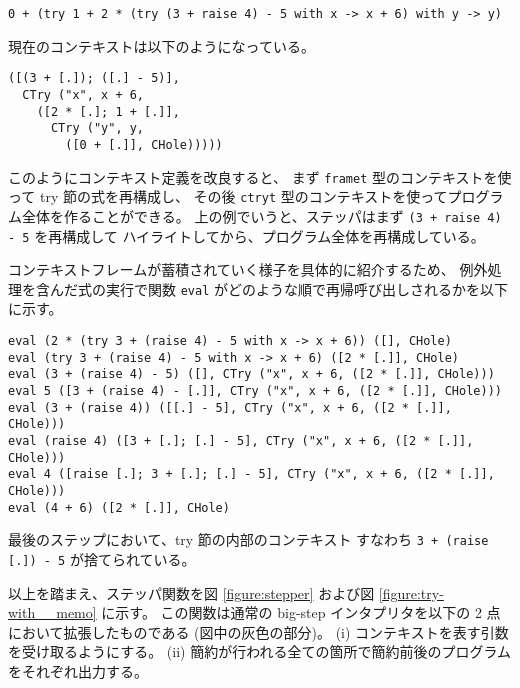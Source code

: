 \begin{verbatim}
0 + (try 1 + 2 * (try (3 + raise 4) - 5 with x -> x + 6) with y -> y)
\end{verbatim}
\noindent 現在のコンテキストは以下のようになっている。
\begin{verbatim}
([(3 + [.]); ([.] - 5)],
  CTry ("x", x + 6,
    ([2 * [.]; 1 + [.]],
      CTry ("y", y,
        ([0 + [.]], CHole)))))
\end{verbatim}

このようにコンテキスト定義を改良すると、
まず \texttt{frame\US t} 型のコンテキストを使って try 節の式を再構成し、
その後 \texttt{ctry\US t} 型のコンテキストを使ってプログラム全体を作ることができる。
上の例でいうと、ステッパはまず \texttt{(3 + raise 4) - 5} を再構成して
ハイライトしてから、プログラム全体を再構成している。

コンテキストフレームが蓄積されていく様子を具体的に紹介するため、
例外処理を含んだ式の実行で関数 \texttt{eval} がどのような順で再帰呼び出しされるかを以下に示す。

\begin{verbatim}
eval (2 * (try 3 + (raise 4) - 5 with x -> x + 6)) ([], CHole)
eval (try 3 + (raise 4) - 5 with x -> x + 6) ([2 * [.]], CHole)
eval (3 + (raise 4) - 5) ([], CTry ("x", x + 6, ([2 * [.]], CHole)))
eval 5 ([3 + (raise 4) - [.]], CTry ("x", x + 6, ([2 * [.]], CHole)))
eval (3 + (raise 4)) ([[.] - 5], CTry ("x", x + 6, ([2 * [.]], CHole)))
eval (raise 4) ([3 + [.]; [.] - 5], CTry ("x", x + 6, ([2 * [.]], CHole)))
eval 4 ([raise [.]; 3 + [.]; [.] - 5], CTry ("x", x + 6, ([2 * [.]], CHole)))
eval (4 + 6) ([2 * [.]], CHole)
\end{verbatim}

\noindent 最後のステップにおいて、try 節の内部のコンテキスト
すなわち \texttt{3 + (raise [.])\ - 5} が捨てられている。

以上を踏まえ、ステッパ関数を図 \ref{figure:stepper} および図 \ref{figure:try-with__memo} に示す。
この関数は通常の big-step インタプリタを以下の 2 点において拡張したものである (図中の灰色の部分)。
(i) コンテキストを表す引数を受け取るようにする。
(ii) 簡約が行われる全ての箇所で簡約前後のプログラムをそれぞれ出力する。

